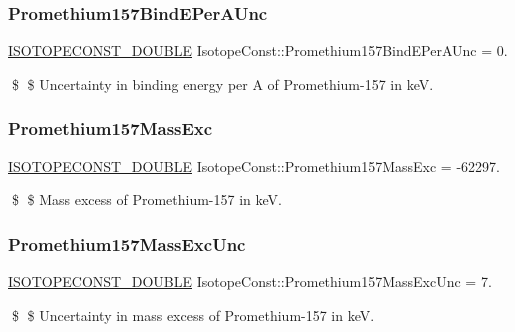 \subsubsection{\texorpdfstring{Promethium157\+Bind\+E\+Per\+A\+Unc}{Promethium157BindEPerAUnc}}
{\footnotesize\ttfamily \mbox{\hyperlink{group___isotope_const-_macros_ga8f45a7272ce02c0b4c65c44636ed719a}{I\+S\+O\+T\+O\+P\+E\+C\+O\+N\+S\+T\+\_\+\+D\+O\+U\+B\+LE}} Isotope\+Const\+::\+Promethium157\+Bind\+E\+Per\+A\+Unc = 0.}

\$ \$ Uncertainty in binding energy per A of Promethium-\/157 in keV. \mbox{\label{group___isotope_const-_promethium-_pm157_ga393fd8b1b4581285fe84704d13272f08}} 
\subsubsection{\texorpdfstring{Promethium157\+Mass\+Exc}{Promethium157MassExc}}
{\footnotesize\ttfamily \mbox{\hyperlink{group___isotope_const-_macros_ga8f45a7272ce02c0b4c65c44636ed719a}{I\+S\+O\+T\+O\+P\+E\+C\+O\+N\+S\+T\+\_\+\+D\+O\+U\+B\+LE}} Isotope\+Const\+::\+Promethium157\+Mass\+Exc = -\/62297.}

\$ \$ Mass excess of Promethium-\/157 in keV. \mbox{\label{group___isotope_const-_promethium-_pm157_ga6379c979934b3198632088f424d154f4}} 
\subsubsection{\texorpdfstring{Promethium157\+Mass\+Exc\+Unc}{Promethium157MassExcUnc}}
{\footnotesize\ttfamily \mbox{\hyperlink{group___isotope_const-_macros_ga8f45a7272ce02c0b4c65c44636ed719a}{I\+S\+O\+T\+O\+P\+E\+C\+O\+N\+S\+T\+\_\+\+D\+O\+U\+B\+LE}} Isotope\+Const\+::\+Promethium157\+Mass\+Exc\+Unc = 7.}

\$ \$ Uncertainty in mass excess of Promethium-\/157 in keV. \mbox{\label{group___isotope_const-_promethium-_pm157_ga621ee6015652758caa7d812cf97fc341}} 
